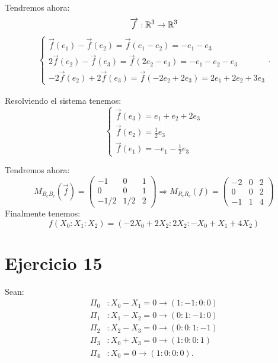 \documentclass[10pt,a4paper,openright]{book}
\theoremstyle{break}
\begin{document}
Tendremos ahora: 
\[
\overrightarrow{f}: \mathbb{R}^3 \rightarrow \mathbb{R}^3\\
\]
\begin{align*}
    \begin{cases}
    \overrightarrow{f}\left( e_1 \right) - \overrightarrow{f} \left( e_2 \right) = \overrightarrow{f} \left( e_1 - e_2 \right) = -e_1 - e_3\\
    2\overrightarrow{f}\left( e_2 \right) - \overrightarrow{f}\left( e_3 \right) = \overrightarrow{f} \left( 2e_2 - e_3 \right) = -e_1 - e_2 - e_3\\
    -2 \overrightarrow{f} \left( e_2 \right) + 2\overrightarrow{f} \left( e_3 \right) = \overrightarrow{f} \left( -2e_2 + 2e_3 \right) = 2e_1 + 2e_2 + 3e_3    
    \end{cases} 
.\end{align*}

Resolviendo el sistema tenemos:
\[
\begin{cases}
    \overrightarrow{f} \left( e_3 \right) = e_1 + e_2 + 2e_3\\
    \overrightarrow{f} \left( e_2 \right) = \frac{1}{2} e_3\\
    \overrightarrow{f} \left( e_1 \right) = -e_1 - \frac{1}{2} e_3
\end{cases} 
\]

Tendremos ahora:
\[
    M_{B_cB_c} \left( \overrightarrow{f} \right) = \begin{pmatrix} -1 & 0 & 1\\ 0 & 0 & 1\\ -1/2 & 1/2 & 2 \end{pmatrix} \Rightarrow M_{R_cR_c} \left( f \right) = \begin{pmatrix} -2 & 0 & 2\\ 0 & 0 & 2\\ -1 & 1 & 4 \end{pmatrix} 
\]
Finalmente tenemos:
\[
\boxed{f\left( X_0 : X_1 : X_2 \right) = \left( -2X_0 + 2X_2 : 2X_2 : -X_0 + X_1 + 4X_2 \right) } 
\]

\section{Ejercicio 15}%
\label{sec:ejercicio_15_3}
Sean: 
\begin{align*}
    \Pi_0 &: X_0 - X_1 = 0 \rightarrow \left( 1 : -1 : 0 : 0 \right) \\
    \Pi_1 &: X_1 - X_2 = 0 \rightarrow \left( 0 : 1 : -1 : 0 \right)\\
    \Pi_2 &: X_2 - X_3 = 0 \rightarrow \left( 0 : 0 : 1 : -1 \right)\\
    \Pi_3 &: X_0 + X_3 = 0 \rightarrow \left( 1 : 0 : 0 : 1 \right)\\
    \Pi_4 &: X_0 = 0 \rightarrow \left( 1 : 0 : 0 : 0 \right)
.\end{align*}
\end{document}

